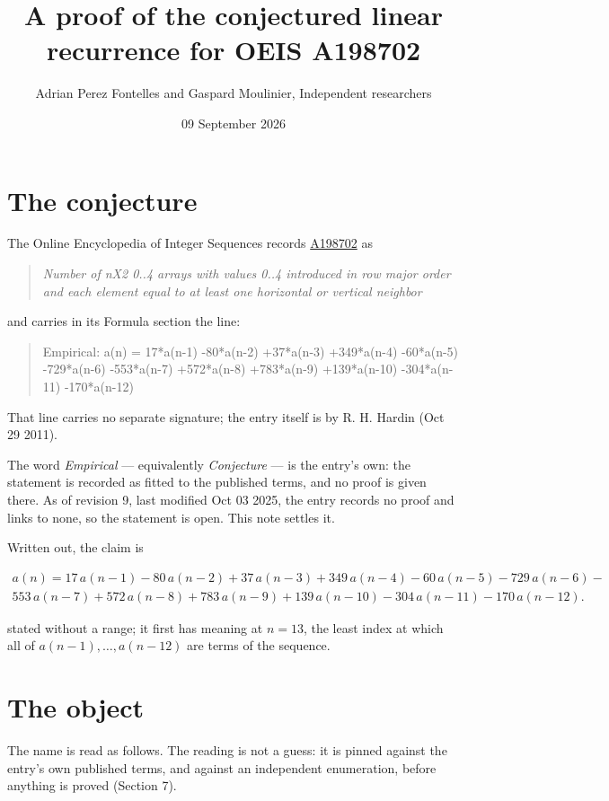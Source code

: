 \documentclass[11pt]{article}
\title{A proof of the conjectured linear recurrence for OEIS A198702}
\author{Adrian Perez Fontelles and Gaspard Moulinier, Independent researchers}
\date{09 September 2026}
\theoremstyle{definition}
\begin{document}
\maketitle
\section{The conjecture}

The Online Encyclopedia of Integer Sequences records \href{https://oeis.org/A198702}{A198702} as

\begin{quote}\itshape Number of nX2 0..4 arrays with values 0..4 introduced in row major order and each element equal to at least one horizontal or vertical neighbor\end{quote}

and carries in its Formula section the line:

\begin{quote}\ttfamily Empirical: a(n) = 17*a(n-1) -80*a(n-2) +37*a(n-3) +349*a(n-4) -60*a(n-5) -729*a(n-6) -553*a(n-7) +572*a(n-8) +783*a(n-9) +139*a(n-10) -304*a(n-11) -170*a(n-12)\end{quote}

That line carries no separate signature; the entry itself is by R. H. Hardin (Oct 29 2011).

The word {\itshape Empirical} --- equivalently {\itshape Conjecture} --- is the entry's own: the statement is recorded as fitted to the published terms, and no proof is given there. As of revision 9, last modified Oct 03 2025, the entry records no proof and links to none, so the statement is open. This note settles it.

Written out, the claim is

\begin{multline*} a(n) = 17\,a(n-1) - 80\,a(n-2) + 37\,a(n-3) + 349\,a(n-4) - 60\,a(n-5) - 729\,a(n-6) - \\ 553\,a(n-7) + 572\,a(n-8) + 783\,a(n-9) + 139\,a(n-10) - 304\,a(n-11) - 170\,a(n-12). \end{multline*}

stated without a range; it first has meaning at $n = 13$, the least index at which all of $a(n-1),\dots,a(n-12)$ are terms of the sequence.

\section{The object}

The name is read as follows. The reading is not a guess: it is pinned against the entry's own published terms, and against an independent enumeration, before anything is proved (Section 7).
\end{document}
